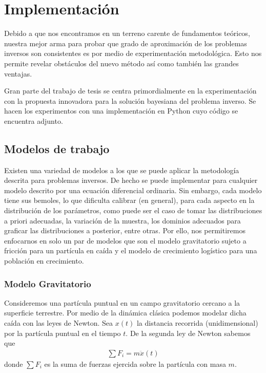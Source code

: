 \chapter{Implementación} 


Debido a que nos encontramos en un terreno carente de fundamentos teóricos, nuestra mejor arma para probar que grado de aproximación de los problemas inversos son consistentes es por medio de experimentación metodológica. Esto nos permite revelar obstáculos del nuevo método así como también las grandes ventajas. 

Gran parte del trabajo de tesis se centra primordialmente en la experimentación con la propuesta innovadora para la solución bayesiana del problema inverso. Se hacen los experimentos con una implementación en Python cuyo código se encuentra adjunto.


\section{Modelos de trabajo}

Existen una variedad de modelos a los que se puede aplicar la metodología descrita para problemas inversos. De hecho se puede implementar para cualquier modelo descrito por una ecuación diferencial ordinaria. Sin embargo, cada modelo tiene sus bemoles, lo que dificulta calibrar (en general), para cada aspecto en la distribución de los parámetros, como puede ser el caso de tomar las distribuciones a priori adecuadas, la variación de la muestra, los dominios adecuados para graficar las distribuciones a posterior, entre otras. Por ello, nos permitiremos enfocarnos en solo un par de modelos que son el modelo gravitatorio sujeto a fricción para un partícula en caída y el modelo de crecimiento logístico para una población en crecimiento. 


\subsection{Modelo Gravitatorio}

Consideremos una partícula puntual en un campo gravitatorio cercano a la superficie terrestre. Por medio de la dinámica clásica podemos modelar dicha caída con las leyes de Newton. Sea $x(t)$ la distancia recorrida (unidimensional) por la partícula puntual en el tiempo $t$. De la segunda ley de Newton sabemos que
\begin{align}
    \sum F_i = m\ddot{x}(t) 
    \label{3.1.01}
\end{align}
donde $\sum F_i$ es la suma de fuerzas ejercida sobre la partícula con masa $m$. 

